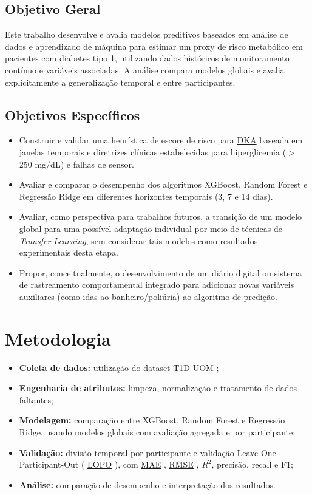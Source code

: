 \documentclass[12pt,a4paper]{article}
\DeclareRobustCommand{\sigla}[1]{%
    \texorpdfstring{\hyperlink{sigla:#1}{#1}}{#1}%
}
\begin{document}
\subsection{Objetivo Geral}
Este trabalho desenvolve e avalia modelos preditivos baseados em análise de
dados e aprendizado de máquina para estimar um proxy de risco metabólico em
pacientes com diabetes tipo 1, utilizando dados históricos de monitoramento
contínuo e variáveis associadas. A análise compara modelos globais e avalia
explicitamente a generalização temporal e entre participantes.


\subsection{Objetivos Específicos}
\begin{itemize}
    \item Construir e validar uma heurística de escore de risco para \sigla{DKA} baseada em janelas temporais e diretrizes clínicas estabelecidas para hiperglicemia ($>$ 250 mg/dL) e falhas de sensor.
    \item Avaliar e comparar o desempenho dos algoritmos XGBoost, Random Forest e Regressão Ridge em diferentes horizontes temporais (3, 7 e 14 dias).
    \item Avaliar, como perspectiva para trabalhos futuros, a transição de um modelo global para uma possível adaptação individual por meio de técnicas de \textit{Transfer Learning}, sem considerar tais modelos como resultados experimentais desta etapa.
    \item Propor, conceitualmente, o desenvolvimento de um diário digital ou sistema de rastreamento comportamental integrado para adicionar novas variáveis auxiliares (como idas ao banheiro/poliúria) ao algoritmo de predição.
\end{itemize}


\section{Metodologia}
\begin{itemize}
    \item \textbf{Coleta de dados:} utilização do dataset \sigla{T1D-UOM} \cite{alsuhaymi2025};

    \item \textbf{Engenharia de atributos:}  limpeza, normalização e tratamento de dados faltantes;

    \item \textbf{Modelagem:} comparação entre XGBoost, Random Forest e Regressão Ridge, usando modelos globais com avaliação agregada e por participante;

    \item \textbf{Validação:} divisão temporal por participante e validação Leave-One-Participant-Out (\sigla{LOPO}), com \sigla{MAE}, \sigla{RMSE}, $R^2$, precisão, recall e F1;

    \item \textbf{Análise:} comparação de desempenho e interpretação dos resultados.
\end{itemize}
\end{document}
